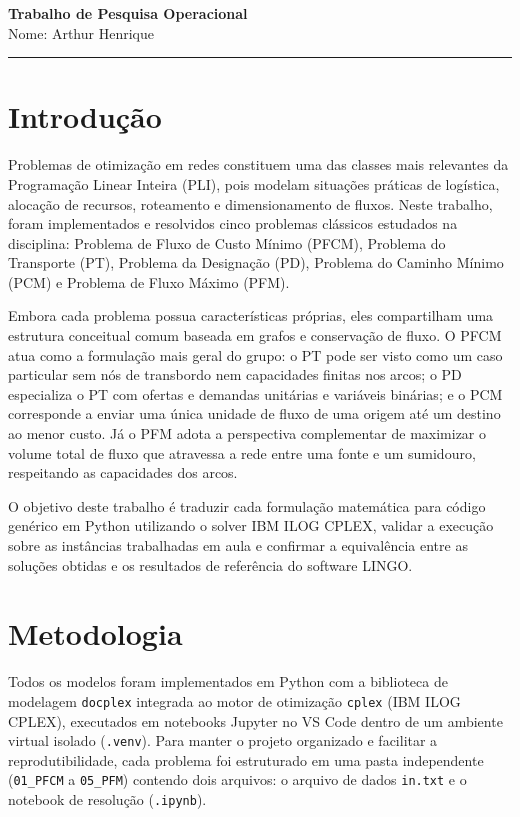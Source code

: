 \documentclass[11pt,a4paper]{article}
\begin{document}
{\Large\bfseries Trabalho de Pesquisa Operacional}\\[4pt]
Nome: Arthur Henrique

\vspace{4pt}
\hrule
\vspace{10pt}

\section{Introdução}
Problemas de otimização em redes constituem uma das classes mais relevantes da Programação Linear Inteira (PLI), pois modelam situações práticas de logística, alocação de recursos, roteamento e dimensionamento de fluxos. Neste trabalho, foram implementados e resolvidos cinco problemas clássicos estudados na disciplina: Problema de Fluxo de Custo Mínimo (PFCM), Problema do Transporte (PT), Problema da Designação (PD), Problema do Caminho Mínimo (PCM) e Problema de Fluxo Máximo (PFM).

Embora cada problema possua características próprias, eles compartilham uma estrutura conceitual comum baseada em grafos e conservação de fluxo. O PFCM atua como a formulação mais geral do grupo: o PT pode ser visto como um caso particular sem nós de transbordo nem capacidades finitas nos arcos; o PD especializa o PT com ofertas e demandas unitárias e variáveis binárias; e o PCM corresponde a enviar uma única unidade de fluxo de uma origem até um destino ao menor custo. Já o PFM adota a perspectiva complementar de maximizar o volume total de fluxo que atravessa a rede entre uma fonte e um sumidouro, respeitando as capacidades dos arcos.

O objetivo deste trabalho é traduzir cada formulação matemática para código genérico em Python utilizando o solver IBM ILOG CPLEX, validar a execução sobre as instâncias trabalhadas em aula e confirmar a equivalência entre as soluções obtidas e os resultados de referência do software LINGO.

\section{Metodologia}
Todos os modelos foram implementados em Python com a biblioteca de modelagem \texttt{docplex} integrada ao motor de otimização \texttt{cplex} (IBM ILOG CPLEX), executados em notebooks Jupyter no VS Code dentro de um ambiente virtual isolado (\texttt{.venv}). Para manter o projeto organizado e facilitar a reprodutibilidade, cada problema foi estruturado em uma pasta independente (\texttt{01\_PFCM} a \texttt{05\_PFM}) contendo dois arquivos: o arquivo de dados \texttt{in.txt} e o notebook de resolução (\texttt{.ipynb}).
\end{document}
